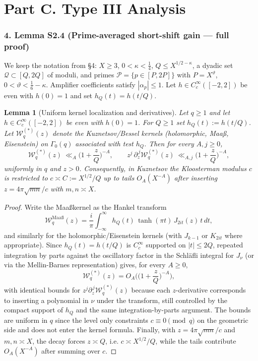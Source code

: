 \documentclass[11pt]{article}
\newtheorem{lemma}{Lemma}[section]
\theoremstyle{definition}
\theoremstyle{remark}
\begin{document}
\part*{Part C. Type III Analysis}

\section*{4. Lemma S2.4 (Prime-averaged short-shift gain — full proof)}

We keep the notation from §4: $X\ge 3$, $0<\kappa<\tfrac14$, $Q\le X^{1/2-\kappa}$, a dyadic set $\mathcal Q\subset[Q,2Q]$ of moduli, and primes $\mathcal P=\{p\in[P,2P]\}$ with $P=X^\vartheta$, $0<\vartheta<\tfrac16-\kappa$. Amplifier coefficients satisfy $|\alpha_p|\le 1$. Let $h\in C_c^\infty([-2,2])$ be even with $h(0)=1$ and set $h_Q(t)=h(t/Q)$.

\begin{lemma}[Uniform kernel localization and derivatives]\label{lem:kernel-localization}
	Let $q\ge 1$ and let $h\in C_c^\infty([-2,2])$ be even with $h(0)=1$. For $Q\ge 1$ set $h_Q(t):=h(t/Q)$. Let $\mathcal W_q^{(*)}(z)$ denote the Kuznetsov/Bessel kernels (holomorphic, Maaß, Eisenstein) on $\Gamma_0(q)$ associated with test $h_Q$. Then for every $A,j\ge 0$,
	\[
		\mathcal W_q^{(*)}(z)\ \ll_A \Big(1+\frac{z}{Q}\Big)^{-A},\qquad
		z^j\,\partial_z^{\,j}\mathcal W_q^{(*)}(z)\ \ll_{A,j}\Big(1+\frac{z}{Q}\Big)^{-A},
	\]
	uniformly in $q$ and $z>0$. Consequently, in Kuznetsov the Kloosterman modulus $c$ is restricted to $c\asymp C:=X^{1/2}/Q$ up to tails $O_A(X^{-A})$ after inserting $z=4\pi\sqrt{mn}/c$ with $m,n\asymp X$.
\end{lemma}

\begin{proof}
	Write the Maa\ss kernel as the Hankel transform
	\[
		\mathcal W_q^{\mathrm{Maa\text{\ss}}}(z) = \frac{i}{\pi}\int_{-\infty}^{\infty} h_Q(t)\,\tanh(\pi t)\,J_{2it}(z)\,t\,dt,
	\]
	and similarly for the holomorphic/Eisenstein kernels (with $J_{k-1}$ or $K_{2it}$ where appropriate). Since $h_Q(t)=h(t/Q)$ is $C_c^\infty$ supported on $|t|\le 2Q$, repeated integration by parts against the oscillatory factor in the Schl\"afli integral for $J_\nu$ (or via the Mellin-Barnes representation) gives, for every $A\ge 0$,
	\[
		\mathcal W_q^{(*)}(z)=O_A\!\Big(\Big(1+\frac{z}{Q}\Big)^{-A}\Big),
	\]
	with identical bounds for $z^j\partial_z^{\,j}\mathcal W_q^{(*)}(z)$ because each $z$-derivative corresponds to inserting a polynomial in $\nu$ under the transform, still controlled by the compact support of $h_Q$ and the same integration-by-parts argument. The bounds are uniform in $q$ since the level only constraints $c\equiv 0\pmod q$ on the geometric side and does not enter the kernel formula.
	Finally, with $z=4\pi\sqrt{mn}/c$ and $m,n\asymp X$, the decay forces $z\asymp Q$, i.e. $c\asymp X^{1/2}/Q$, while the tails contribute $O_A(X^{-A})$ after summing over $c$.
\end{proof}
\end{document}
